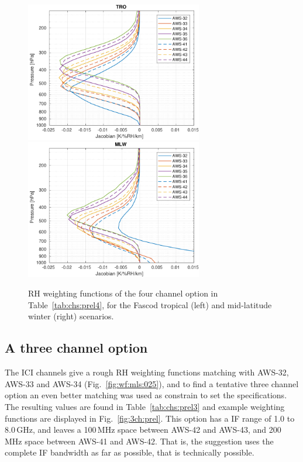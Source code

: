 \documentclass[12pt]{article}
\begin{document}
\begin{figure}[!p]
  \centering
  \includegraphics[height=61mm]{fascod_4chopt_tro}\hspace{5mm}%
  \includegraphics[clip,trim=43 0 0 0,height=61mm]{fascod_4chopt_mlw}
  \caption{RH weighting functions of the four channel option in
    Table~\ref{tab:chs:prel4}, for the Fascod tropical (left) and mid-latitude
    winter (right) scenarios.}
  \label{fig:4ch:prel}
\end{figure}


\subsection{A three channel option}
%
The ICI channels give a rough RH weighting functions matching with AWS-32,
AWS-33 and AWS-34 (Fig.~\ref{fig:wf:mls:025}), and to find a tentative three
channel option an even better matching was used as constrain to set the
specifications. The resulting values are found in Table~\ref{tab:chs:prel3} and
example weighting functions are displayed in Fig.~\ref {fig:3ch:prel}. This
option has a IF range of 1.0 to 8.0\,GHz, and leaves a 100\,MHz space between
AWS-42 and AWS-43, and 200\,MHz space between AWS-41 and AWS-42. That is, the
suggestion uses the complete IF bandwidth as far as possible, that is
technically possible.
\end{document}
